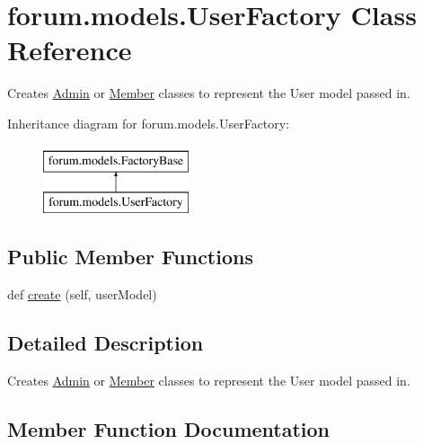 \hypertarget{classforum_1_1models_1_1_user_factory}{}\section{forum.\+models.\+User\+Factory Class Reference}
\label{classforum_1_1models_1_1_user_factory}


Creates \mbox{\hyperlink{classforum_1_1models_1_1_admin}{Admin}} or \mbox{\hyperlink{classforum_1_1models_1_1_member}{Member}} classes to represent the User model passed in.  


Inheritance diagram for forum.\+models.\+User\+Factory\+:\begin{figure}[H]
\begin{center}
\leavevmode
\includegraphics[height=2.000000cm]{classforum_1_1models_1_1_user_factory}
\end{center}
\end{figure}
\subsection*{Public Member Functions}
\begin{DoxyCompactItemize}
\item 
def \mbox{\hyperlink{classforum_1_1models_1_1_user_factory_aa8776c7b9f2cd91af5f42dc3cf425d04}{create}} (self, user\+Model)
\end{DoxyCompactItemize}


\subsection{Detailed Description}
Creates \mbox{\hyperlink{classforum_1_1models_1_1_admin}{Admin}} or \mbox{\hyperlink{classforum_1_1models_1_1_member}{Member}} classes to represent the User model passed in. 

\subsection{Member Function Documentation}
\mbox{\label{classforum_1_1models_1_1_user_factory_aa8776c7b9f2cd91af5f42dc3cf425d04}} 

